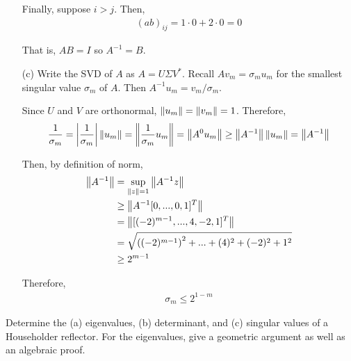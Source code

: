 \documentclass[10pt]{article}
\begin{document}
\begin{solution}[Solution]
\begin{enumerate}
        Finally, suppose \( i>j \). Then,
        \begin{align*}
            (ab)_{ij} = 1\cdot0 + 2\cdot 0 = 0 
        \end{align*}

        That is, \( AB=I \) so \( A^{-1}=B \).

   \item[(c)] Write the SVD of \( A \) as \( A=U\Sigma V^* \). Recall \( Av_m=\sigma_mu_m \) for the smallest singular value \( \sigma_m \) of \( A \). Then \( A^{-1}u_m = v_m/\sigma_m \).

        Since \( U \) and \( V \) are orthonormal, \( \left\lVert u_m\right\rVert = \left\lVert v_m\right\rVert=1 \). Therefore,
        \begin{align*}
            \dfrac{1}{\sigma_m} = \left|\dfrac{1}{\sigma_m}\right|\left\lVert u_m\right\rVert=\left\lVert\dfrac{1}{\sigma_m}u_m\right\rVert = \left\lVert A^{0}u_m\right\rVert \geq \left\lVert A^{-1}\right\rVert\left\lVert u_m\right\rVert = \left\lVert A^{-1}\right\rVert 
        \end{align*}
        
        Then, by definition of norm,
        \begin{align*}
            \left\lVert A^{-1}\right\rVert &= \sup_{\left\lVert z\right\rVert=1} \left\lVert A^{-1}z\right\rVert \\
            &\geq \left\lVert A^{-1} [0,...,0,1]^T\right\rVert \\
            &= \left\lVert[(-2)^{m-1},...,4,-2,1]^T\right\rVert \\ 
            &= \sqrt{\left((-2)^{m-1}\right)^2 + ... + (4)^2+(-2)^2+1^2 } \\
            &\geq 2^{m-1}
        \end{align*}

        Therefore,
        \begin{align*}
            \sigma_m \leq 2^{1-m}
        \end{align*}
\end{enumerate}
\end{solution}


\begin{problem}[Exercise 10.1]
Determine the (a) eigenvalues, (b) determinant, and (c) singular values of a Householder reflector. For the eigenvalues, give a geometric argument as well as an algebraic proof.
\end{problem}
\end{document}
